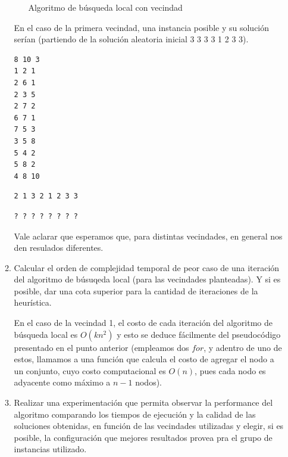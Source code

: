 \documentclass[11pt, a4paper, twoside]{article}
\begin{document}
\begin{enumerate}
\begin{enumerate}
\begin{enumerate}
\begin{algorithm}
					\caption{Algoritmo de búsqueda local con vecindad }
					\end{algorithm}
				  
		\end{enumerate}
		
		En el caso de la primera vecindad, una instancia posible y su solución serían (partiendo de la solución 
		aleatoria inicial 3 3 3 3 1 2 3 3). \\
		
\begin{minipage}[t]{0.4\textwidth}
\begin{Verbatim}[frame=single,framesep=1cm,label= Ejemplo de entrada]
8 10 3
1 2 1
2 6 1
2 3 5
2 7 2
6 7 1
7 5 3
3 5 8
5 4 2
5 8 2
4 8 10
\end{Verbatim}
\end{minipage}
\hfill
\begin{minipage}[t]{0.4\textwidth}
\begin{Verbatim}[frame=single,framesep=1cm,label= Ejemplo de salida: vecindad 1]
2 1 3 2 1 2 3 3
\end{Verbatim}
\hfill
\begin{Verbatim}[frame=single,framesep=1cm,label= Ejemplo de salida: vecindad 2]
? ? ? ? ? ? ? ?
\end{Verbatim}
\end{minipage}
		
		Vale aclarar que esperamos que, para distintas vecindades, en general nos den resulados diferentes. \\
		
		\item Calcular el orden de complejidad temporal de peor caso de una iteración del algoritmo de búsuqeda local
			  (para las vecindades planteadas). Y si es posible, dar una cota superior para la cantidad de iteraciones
			  de la heurística. 
			  
			  En el caso de la vecindad 1, el costo de cada iteración del algoritmo de búsqueda local es $O(kn^2)$ y esto
			  se deduce fácilmente del pseudocódigo presentado en el punto anterior (empleamos dos $for$, y adentro de uno
			  de estos, llamamos a una función que calcula el costo de agregar el nodo a un conjunto, cuyo costo computacional
			  es $O(n)$, pues cada nodo es adyacente como máximo a $n-1$ nodos).
			  
	    \item Realizar una experimentación que permita observar la performance del algoritmo comparando los tiempos
			  de ejecución y la calidad de las soluciones obtenidas, en función de las vecindades utilizadas y elegir,
			  si es posible, la configuración que mejores resultados provea pra el grupo de instancias utilizado.
    \end{enumerate}
\end{enumerate}





\end{document}
